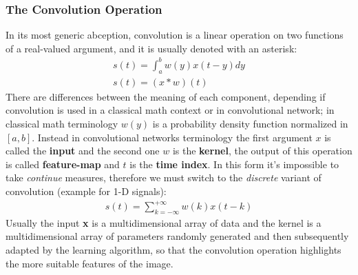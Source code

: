 \documentclass[11pt,a4paper,titlepage]{book}
\begin{document}
\subsubsection{The Convolution Operation}
\label{convolution:explanation}
In its most generic abception, convolution is a linear operation on two functions of a real-valued argument, and it is usually denoted with an asterisk:
\begin{align}
    s(t) = \int_{a}^{b} w(y) x(t-y) dy \\
    s(t) = (x*w)(t)
\end{align}
There are differences between the meaning of each component, depending if convolution is used in a classical math context or in convolutional network; in classical math terminology $w(y)$ is a probability density function normalized in $[a,b]$.
\newline
Instead in convolutional networks terminology the first argument $x$ is called the \textbf{input} and the second one $w$ is the \textbf{kernel}, the output of this operation is called \textbf{feature-map} and $t$ is the \textbf{time index}.
In this form it's impossible to take \textit{continue} measures, therefore we must switch to the \textit{discrete} variant of convolution (example for 1-D signals):
\begin{align}
    s(t) = \sum_{k=-\infty}^{+\infty} w(k) x(t-k)    
\end{align}
Usually the input \textbf{x} is a multidimensional array of data and the kernel is a multidimensional array of parameters randomly generated and then subsequently adapted by the learning algorithm, so that the convolution operation highlights the more suitable features of the image.
\end{document}
